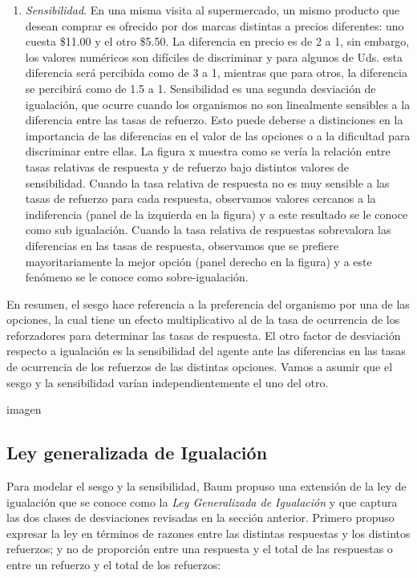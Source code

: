 \documentclass[
  a4paper,
  DIV=11,
  numbers=noendperiod]{scrreprt}
\providecommand{\tightlist}{%
  \setlength{\itemsep}{0pt}\setlength{\parskip}{0pt}}\usepackage{longtable,booktabs,array}
\begin{document}
\begin{enumerate}
\def\labelenumi{\arabic{enumi}.}
\setcounter{enumi}{1}
\tightlist
\item
  \emph{Sensibilidad}. En una misma visita al supermercado, un mismo
  producto que desean comprar es ofrecido por dos marcas distintas a
  precios diferentes: uno cuesta \$11.00 y el otro \$5.50. La diferencia
  en precio es de 2 a 1, sin embargo, los valores numéricos son
  difíciles de discriminar y para algunos de Uds. esta diferencia será
  percibida como de 3 a 1, mientras que para otros, la diferencia se
  percibirá como de 1.5 a 1. Sensibilidad es una segunda desviación de
  igualación, que ocurre cuando los organismos no son linealmente
  sensibles a la diferencia entre las tasas de refuerzo. Esto puede
  deberse a distinciones en la importancia de las diferencias en el
  valor de las opciones o a la dificultad para discriminar entre ellas.
  La figura x muestra como se vería la relación entre tasas relativas de
  respuesta y de refuerzo bajo distintos valores de sensibilidad. Cuando
  la tasa relativa de respuesta no es muy sensible a las tasas de
  refuerzo para cada respuesta, observamos valores cercanos a la
  indiferencia (panel de la izquierda en la figura) y a este resultado
  se le conoce como sub igualación. Cuando la tasa relativa de
  respuestas sobrevalora las diferencias en las tasas de respuesta,
  observamos que se prefiere mayoritariamente la mejor opción (panel
  derecho en la figura) y a este fenómeno se le conoce como
  sobre-igualación.
\end{enumerate}

En resumen, el sesgo hace referencia a la preferencia del organismo por
una de las opciones, la cual tiene un efecto multiplicativo al de la
tasa de ocurrencia de los reforzadores para determinar las tasas de
respuesta. El otro factor de desviación respecto a igualación es la
sensibilidad del agente ante las diferencias en las tasas de ocurrencia
de los refuerzos de las distintas opciones. Vamos a asumir que el sesgo
y la sensibilidad varían independientemente el uno del otro.

imagen

\subsection{Ley generalizada de
Igualación}\label{ley-generalizada-de-igualaciuxf3n}

Para modelar el sesgo y la sensibilidad, Baum propuso una extensión de
la ley de igualación que se conoce como la \emph{Ley Generalizada de
Igualación} y que captura las dos clases de desviaciones revisadas en la
sección anterior. Primero propuso expresar la ley en términos de razones
entre las distintas respuestas y los distintos refuerzos; y no de
proporción entre una respuesta y el total de las respuestas o entre un
refuerzo y el total de los refuerzos:
\end{document}
